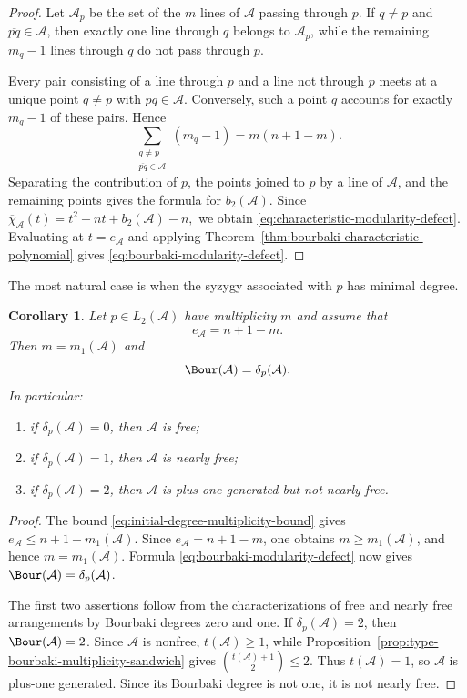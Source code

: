 \documentclass[11pt]{amsart}   %
\newtheorem{Corollary}[Theorem]{Corollary}
\theoremstyle{definition}
\def\A{{\mathcal A}}
\begin{document}
\begin{proof}
Let $\A_p$ be the set of the $m$ lines of $\A$ passing through $p$. If $q\neq p$ and $\overline{pq}\in\A$, then exactly one line through $q$ belongs to $\A_p$, while the remaining $m_q-1$ lines through $q$ do not pass through $p$.

Every pair consisting of a line through $p$ and a line not through $p$ meets at a unique point $q\neq p$ with $\overline{pq}\in\A$. Conversely, such a point $q$ accounts for exactly $m_q-1$ of these pairs. Hence
\[
\sum_{\substack{q\neq p\\ \overline{pq}\in\A}}
(m_q-1)
=
m(n+1-m).
\]
Separating the contribution of $p$, the points joined to $p$ by a line of $\A$, and the remaining points gives the formula for $b_2(\A)$. Since $\overline{\chi}_\A(t)=t^2-nt+b_2(\A)-n,$ we obtain \eqref{eq:characteristic-modularity-defect}. Evaluating at $t=e_\A$ and applying Theorem~\ref{thm:bourbaki-characteristic-polynomial} gives \eqref{eq:bourbaki-modularity-defect}.
\end{proof}

The most natural case is when the syzygy associated with $p$ has minimal degree.

\begin{Corollary}
\label{cor:bourbaki-modularity-defect}
Let $p\in L_2(\A)$ have multiplicity $m$ and assume that
\[
e_\A=n+1-m.
\]
Then $m=m_1(\A)$ and
\[
\Bour(\A)=\delta_p(\A).
\]
In particular:
\begin{enumerate}
\item if $\delta_p(\A)=0$, then $\A$ is free;
\item if $\delta_p(\A)=1$, then $\A$ is nearly free;
\item if $\delta_p(\A)=2$, then $\A$ is plus-one generated but not
nearly free.
\end{enumerate}
\end{Corollary}

\begin{proof}
The bound \eqref{eq:initial-degree-multiplicity-bound} gives $e_\A\leq n+1-m_1(\A)$. Since $e_\A=n+1-m$, one obtains $m\geq m_1(\A)$, and hence $m=m_1(\A)$. Formula \eqref{eq:bourbaki-modularity-defect} now gives $\Bour(\A)=\delta_p(\A)$.

The first two assertions follow from the characterizations of free and nearly free arrangements by Bourbaki degrees zero and one. If $\delta_p(\A)=2$, then $\Bour(\A)=2$. Since $\A$ is nonfree, $t(\A)\geq1$, while Proposition~\ref{prop:type-bourbaki-multiplicity-sandwich} gives $\binom{t(\A)+1}{2}\leq2.$ Thus $t(\A)=1$, so $\A$ is plus-one generated. Since its Bourbaki degree is not one, it is not nearly free.
\end{proof}
\end{document}
